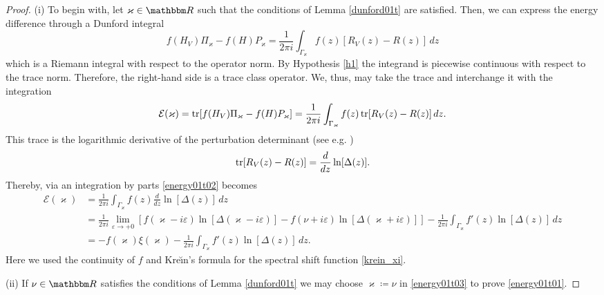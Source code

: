 \begin{proof}
(i)
To begin with, let $\varkappa\in\R$ such that the conditions of Lemma \ref{dunford01t} are satisfied.
Then, we can express the energy difference through a Dunford integral
\begin{equation*}
    f(H_V)\Pi_\varkappa - f(H)P_\varkappa = \frac{1}{2\pi i} \int_{\Gamma_\varkappa} f(z)[ R_V(z) - R(z) ] \, dz  
\end{equation*}
which is a Riemann integral with respect to the operator norm.
By Hypothesis \ref{h1} the integrand is piecewise continuous with respect to the trace norm.
Therefore, the right-hand side is a trace class operator. We, thus, may take the trace and interchange it
with the integration
\begin{equation}\label{energy01t02}
   \mathcal{E}(\varkappa)
    = \operatorname{tr} [f(H_V)\Pi_\varkappa - f(H)P_\varkappa ]
    = \frac{1}{2\pi i} \int_{\Gamma_\varkappa} f(z) \operatorname{tr} [ R_V(z) - R(z) ] \, dz .
\end{equation}
This trace is the logarithmic derivative of the perturbation determinant (see e.g. \cite[(8.1.4)]{Yafaev1992})
\begin{equation*}
  \operatorname{tr} [ R_V(z) - R(z) ] =  \frac{d}{dz} \ln[\Delta(z)] .
\end{equation*}
Thereby, via an integration by parts \eqref{energy01t02} becomes 
\begin{equation}\label{energy01t03}
\begin{split}
  \mathcal{E}(\varkappa)
     & = \frac{1}{2\pi i} \int_{\Gamma_\varkappa} f(z) \frac{d}{dz} \ln[\Delta(z)] \, dz\\
     & = \frac{1}{2\pi i}\lim_{\varepsilon\to+0} [ f(\varkappa-i\varepsilon)\ln[\Delta(\varkappa-i\varepsilon)] 
                                                -f(\nu+i\varepsilon)\ln[\Delta(\varkappa+i\varepsilon)] ]
       - \frac{1}{2\pi i} \int_{\Gamma_\varkappa} f'(z)\ln[\Delta(z)] \, dz\\
     & = - f(\varkappa) \xi(\varkappa) - \frac{1}{2\pi i} \int_{\Gamma_\varkappa} f'(z)\ln[\Delta(z)] \, dz .
\end{split}
\end{equation}
Here we used the continuity of $f$ and Kre\u\i{}n's formula for the spectral shift function \eqref{krein_xi}.

(ii)
If $\nu\in\R$ satisfies the conditions of Lemma \ref{dunford01t} we may choose $\varkappa\coloneqq\nu$ in \eqref{energy01t03}
to prove \eqref{energy01t01}.


\end{proof}
